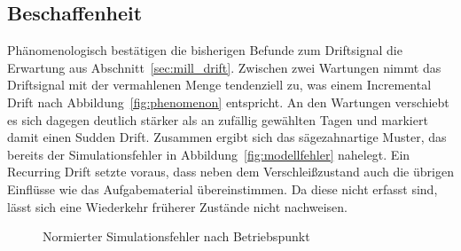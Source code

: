 \subsection{Beschaffenheit} \label{sec:mill_kontext_beschaffenheit}
%
Phänomenologisch bestätigen die bisherigen Befunde zum Driftsignal die Erwartung aus Abschnitt~\ref{sec:mill_drift}. Zwischen zwei Wartungen nimmt das Driftsignal mit der vermahlenen Menge tendenziell zu, was einem Incremental Drift nach Abbildung~\ref{fig:phenomenon} entspricht. An den Wartungen verschiebt es sich dagegen deutlich stärker als an zufällig gewählten Tagen und markiert damit einen Sudden Drift. Zusammen ergibt sich das sägezahnartige Muster, das bereits der Simulationsfehler in Abbildung~\ref{fig:modellfehler} nahelegt. Ein Recurring Drift setzte voraus, dass neben dem Verschleißzustand auch die übrigen Einflüsse wie das Aufgabematerial übereinstimmen. Da diese nicht erfasst sind, lässt sich eine Wiederkehr früherer Zustände nicht nachweisen. \par
%
\begin{figure}[tbp]
    \centering
    
    \caption{Normierter Simulationsfehler nach Betriebspunkt}
    \label{fig:mill_context_op_error}
\end{figure}
%
